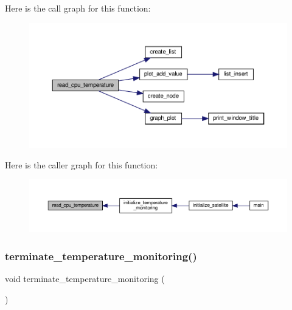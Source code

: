 Here is the call graph for this function\+:
\nopagebreak
\begin{figure}[H]
\begin{center}
\leavevmode
\includegraphics[width=350pt]{temperature-monitoring_8c_a6a33eb327dd6b9aac62b32cf7220cca0_cgraph}
\end{center}
\end{figure}
Here is the caller graph for this function\+:
\nopagebreak
\begin{figure}[H]
\begin{center}
\leavevmode
\includegraphics[width=350pt]{temperature-monitoring_8c_a6a33eb327dd6b9aac62b32cf7220cca0_icgraph}
\end{center}
\end{figure}
\mbox{\label{temperature-monitoring_8c_a8b1be00dadac2a3d808233430fb2cf8b}} 
\subsubsection{\texorpdfstring{terminate\+\_\+temperature\+\_\+monitoring()}{terminate\_temperature\_monitoring()}}
{\footnotesize\ttfamily void terminate\+\_\+temperature\+\_\+monitoring (\begin{DoxyParamCaption}{ }\end{DoxyParamCaption})}

